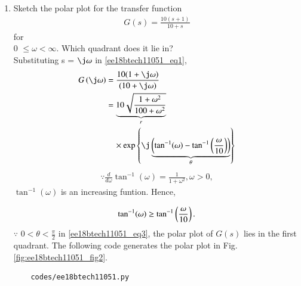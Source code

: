 \begin{enumerate}[label=\thesection.\arabic*.,ref=\thesection.\theenumi]


\item  Sketch the polar plot for the transfer function
\begin{align}
\label{ee18btech11051_eq1}
     G(s) = \frac{10(s+1)}{10+s}
\end{align} for \\0 $\leq \omega < \infty$.
Which quadrant does it lie in?
\\
\solution Substituting s = $\j \omega$ in \eqref{ee18btech11051_eq1},
\begin{align}
\label{ee18btech11051_eq2}
G\brak{\j\omega} &= \frac{10(1+\j\omega)}{(10+\j\omega)}\\
 \label{ee18btech11051_eq3}
&= \underbrace{10\sqrt{\frac{1+\omega^2}{100+\omega^2}}}_{r}
\nonumber \\
&\quad \times \exp\cbrak{\j\underbrace{\brak{\tan^{-1}(\omega)-\tan^{-1}\brak{\frac{\omega}{10}}}}_{\theta}}
\end{align}
%
\begin{align}
\because \frac{d}{d\omega}\tan^{-1}(\omega) = \frac{1}{1+\omega^2}, \omega > 0,
\end{align}
%
$\tan^{-1}(\omega) $ is an increasing funtion.  Hence, 

\begin{align}
\tan^{-1}(\omega) \geq \tan^{-1}\left(\frac{\omega}{10}\right).
\end{align}
$\because $ $0 < \theta < \frac{\pi}{2}$ in \eqref{ee18btech11051_eq3}, the polar plot of $G(s)$ lies in the first quadrant. The following code generates the polar plot in Fig.       \ref{fig:ee18btech11051_fig2}.
%
\begin{lstlisting}
    codes/ee18btech11051.py
\end{lstlisting}


\end{enumerate}
